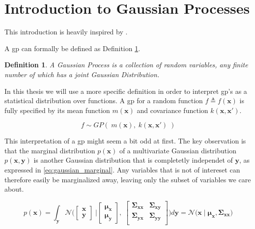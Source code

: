 \section{Introduction to Gaussian Processes}

This introduction is heavily inspired by \cite{rasmussen}.

A \acrfull{gp} can formally be defined as Definition \ref{def:gp}.

\newtheorem{gp_def}{Definition}
\begin{gp_def}\label{def:gp}
A Gaussian Process is a collection of random variables, any finite number of which has a joint Gaussian Distribution.
\end{gp_def}

In this thesis we will use a more specific definition in order to interpret \acrshort{gp}'s as a statistical distribution over functions. A \acrshort{gp} for a random function $f \triangleq f(\boldsymbol{x})$ is fully specified by its mean function $m(\boldsymbol{x})$ and covariance function $k(\boldsymbol{x}, \boldsymbol{x}')$.

\begin{equation}\label{eq:gp}
    f \sim GP(\;m(\boldsymbol{x}), \; k(\boldsymbol{x}, \boldsymbol{x}')\;)
\end{equation}

This interpretation of a \acrshort{gp} might seem a bit odd at first. The key observation is that the marginal distribution $p(\boldsymbol{x})$ of a multivariate Gaussian distribution $p(\boldsymbol{x}, \boldsymbol{y})$ is another Gaussian distribution that is completetly independet of $\boldsymbol{y}$, as expressed in \cref{eq:gaussian_marginal}. Any variables that is not of intereset can therefore easily be marginalized away, leaving only the subset of variables we care about.

\begin{equation}\label{eq:gaussian_marginal}
    p(\boldsymbol{x}) = \int_{\boldsymbol{y}} \mathcal{N} \bigg(\begin{bmatrix}
        \boldsymbol{x} \\ \boldsymbol{y}
    \end{bmatrix}\; \bigg| \begin{bmatrix}
        \boldsymbol{\mu_x} \\ \boldsymbol{\mu_y}
    \end{bmatrix}, \; \begin{bmatrix}
        \boldsymbol{\Sigma_{xx}} & \boldsymbol{\Sigma_{xy}} \\
        \boldsymbol{\Sigma_{yx}} & \boldsymbol{\Sigma_{yy}} \\
    \end{bmatrix} \bigg) d\boldsymbol{y} = \mathcal{N} \big( \boldsymbol{x} \;\big| \; \boldsymbol{\mu_x}, \boldsymbol{\Sigma_{xx}}\big)
\end{equation}

